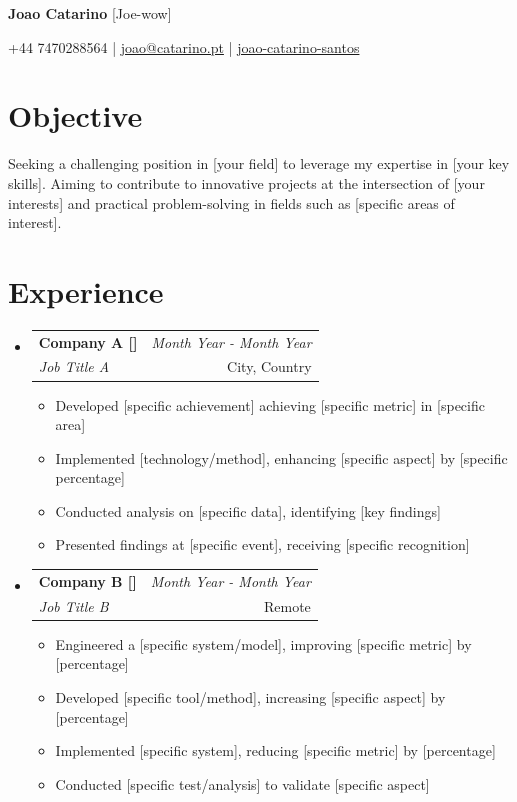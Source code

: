 \documentclass[a4paper,11pt]{article}
\makeatletter
\newcommand{\resumeSubheading}[4]{
\vspace{0.5mm}\item
    \begin{tabular*}{0.98\textwidth}[t]{l@{\extracolsep{\fill}}r}
        \textbf{#1} & \textit{\footnotesize{#4}} \\
        \textit{\footnotesize{#3}} &  \footnotesize{#2}\\
    \end{tabular*}
    \vspace{-2.4mm}
}
\newcommand{\resumeSubHeadingListStart}{\begin{itemize}[leftmargin=*,labelsep=1mm]}
\newcommand{\resumeItemListStart}{\begin{itemize}[leftmargin=*,labelsep=1mm,itemsep=0.5mm]}
\newcommand{\resumeSubHeadingListEnd}{\end{itemize}\vspace{2mm}}
\newcommand{\resumeItemListEnd}{\end{itemize}\vspace{-2mm}}
\newcommand{\socialicon}[1]{\raisebox{-0.05em}{\resizebox{!}{1em}{#1}}}
\newcommand{\headerfontiii}{\fontfamily{ppl}\selectfont} %
\makeatother
\begin{document}
\headerfontiii

\begin{center}
    {\Huge\textbf{Joao Catarino}} \small{[Joe-wow]}
\end{center}
\vspace{-6mm}

\begin{center}
    \small{
    +44 7470288564 | \href{mailto:joao@catarino.pt}{joao@catarino.pt} | \socialicon{\faLinkedin} \href{https://www.linkedin.com/in/joao-catarino-santos/}{joao-catarino-santos} 
    }
\end{center}


\vspace{-4mm}

\section{\textbf{Objective}}
\vspace{1mm}
\small{
Seeking a challenging position in [your field] to leverage my expertise in [your key skills]. Aiming to contribute to innovative projects at the intersection of [your interests] and practical problem-solving in fields such as [specific areas of interest].
}
\vspace{-2mm}



\section{\textbf{Experience}}
\vspace{-0.4mm}
  \resumeSubHeadingListStart
  \resumeSubheading
      {{Company A [\href{https://www.companya.com}{\faIcon{globe}}]}}{City, Country}
      {Job Title A}{Month Year - Month Year}
      \resumeItemListStart
        \item Developed [specific achievement] achieving [specific metric] in [specific area]
        \item Implemented [technology/method], enhancing [specific aspect] by [specific percentage]
        \item Conducted analysis on [specific data], identifying [key findings]
        \item Presented findings at [specific event], receiving [specific recognition]
      \resumeItemListEnd 
  \resumeSubheading
    {Company B [\href{https://www.companyb.com}{\faIcon{globe}}]}{Remote}
    {Job Title B}{Month Year - Month Year}
    \resumeItemListStart
      \item Engineered a [specific system/model], improving [specific metric] by [percentage]
      \item Developed [specific tool/method], increasing [specific aspect] by [percentage]
      \item Implemented [specific system], reducing [specific metric] by [percentage]
      \item Conducted [specific test/analysis] to validate [specific aspect]
    \resumeItemListEnd
  \resumeSubHeadingListEnd
\vspace{-6mm}
\end{document}
